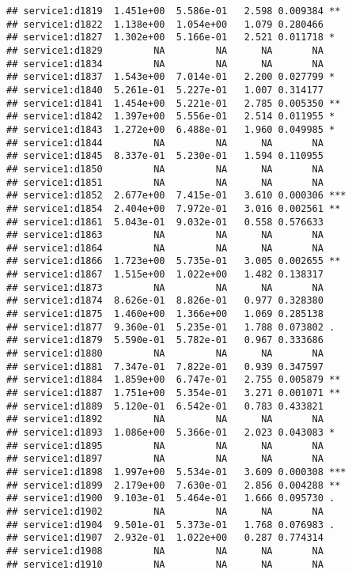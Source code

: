 \documentclass[
]{article}
\begin{document}
\begin{verbatim}
## service1:d1819  1.451e+00  5.586e-01   2.598 0.009384 ** 
## service1:d1822  1.138e+00  1.054e+00   1.079 0.280466    
## service1:d1827  1.302e+00  5.166e-01   2.521 0.011718 *  
## service1:d1829         NA         NA      NA       NA    
## service1:d1834         NA         NA      NA       NA    
## service1:d1837  1.543e+00  7.014e-01   2.200 0.027799 *  
## service1:d1840  5.261e-01  5.227e-01   1.007 0.314177    
## service1:d1841  1.454e+00  5.221e-01   2.785 0.005350 ** 
## service1:d1842  1.397e+00  5.556e-01   2.514 0.011955 *  
## service1:d1843  1.272e+00  6.488e-01   1.960 0.049985 *  
## service1:d1844         NA         NA      NA       NA    
## service1:d1845  8.337e-01  5.230e-01   1.594 0.110955    
## service1:d1850         NA         NA      NA       NA    
## service1:d1851         NA         NA      NA       NA    
## service1:d1852  2.677e+00  7.415e-01   3.610 0.000306 ***
## service1:d1854  2.404e+00  7.972e-01   3.016 0.002561 ** 
## service1:d1861  5.043e-01  9.032e-01   0.558 0.576633    
## service1:d1863         NA         NA      NA       NA    
## service1:d1864         NA         NA      NA       NA    
## service1:d1866  1.723e+00  5.735e-01   3.005 0.002655 ** 
## service1:d1867  1.515e+00  1.022e+00   1.482 0.138317    
## service1:d1873         NA         NA      NA       NA    
## service1:d1874  8.626e-01  8.826e-01   0.977 0.328380    
## service1:d1875  1.460e+00  1.366e+00   1.069 0.285138    
## service1:d1877  9.360e-01  5.235e-01   1.788 0.073802 .  
## service1:d1879  5.590e-01  5.782e-01   0.967 0.333686    
## service1:d1880         NA         NA      NA       NA    
## service1:d1881  7.347e-01  7.822e-01   0.939 0.347597    
## service1:d1884  1.859e+00  6.747e-01   2.755 0.005879 ** 
## service1:d1887  1.751e+00  5.354e-01   3.271 0.001071 ** 
## service1:d1889  5.120e-01  6.542e-01   0.783 0.433821    
## service1:d1892         NA         NA      NA       NA    
## service1:d1893  1.086e+00  5.366e-01   2.023 0.043083 *  
## service1:d1895         NA         NA      NA       NA    
## service1:d1897         NA         NA      NA       NA    
## service1:d1898  1.997e+00  5.534e-01   3.609 0.000308 ***
## service1:d1899  2.179e+00  7.630e-01   2.856 0.004288 ** 
## service1:d1900  9.103e-01  5.464e-01   1.666 0.095730 .  
## service1:d1902         NA         NA      NA       NA    
## service1:d1904  9.501e-01  5.373e-01   1.768 0.076983 .  
## service1:d1907  2.932e-01  1.022e+00   0.287 0.774314    
## service1:d1908         NA         NA      NA       NA    
## service1:d1910         NA         NA      NA       NA    

\end{verbatim}
\end{document}
